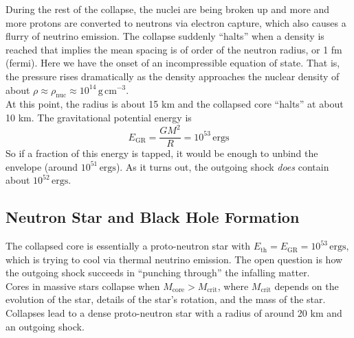 \documentclass[10pt]{article}
\numberwithin{equation}{section}
\newcommand{\n}{\noindent}
\begin{document}
	\n During the rest of the collapse, the nuclei are being
        broken up and more and more protons are converted to neutrons
        via electron capture, which also causes a flurry of neutrino
        emission. The collapse suddenly ``halts'' when a density is
        reached that implies the mean spacing is of order of the
        neutron radius, or 1 fm (fermi). Here we have the onset of an
        incompressible equation of state. That is, the pressure rises
        dramatically as the density approaches the nuclear density of
        about $\rho\approx \rho_{\mathrm{nuc}}\approx
        10^{14}\,\mathrm{g\,cm^{-3}}$.\\ 
	
	\n At this point, the radius is about 15 km and the collapsed
        core ``halts'' at about 10 km. The gravitational potential
        energy is 
	\begin{equation}
	E_{\mathrm{GR}}=\frac{GM^{2}}{R}=10^{53}\,\mathrm{ergs}
	\end{equation}
	So if a fraction of this energy is tapped, it would be enough
        to unbind the envelope (around $10^{51}\,\mathrm{ergs}$). As
        it turns out, the outgoing shock \emph{does} contain about
        $10^{52}\,\mathrm{ergs}$. 
	
	\subsection{Neutron Star and Black Hole Formation}
	\label{sec:neutron-star} 
	The collapsed core is essentially a proto-neutron star with
        $E_{\mathrm{th}}=E_{\mathrm{GR}}=10^{53}\,\mathrm{ergs}$,
        which is trying to cool via thermal neutrino emission. The
        open question is how the outgoing shock succeeds in ``punching
        through'' the infalling matter.\\
	
	\n Cores in massive stars collapse when
        $M_{\mathrm{core}}>M_{\mathrm{crit}}$, where
        $M_{\mathrm{crit}}$ depends on the evolution of the star,
        details of the star's rotation, and the mass of the
        star. Collapses lead to a dense proto-neutron star with a
        radius of around 20 km and an outgoing shock. 
	
\end{document}
